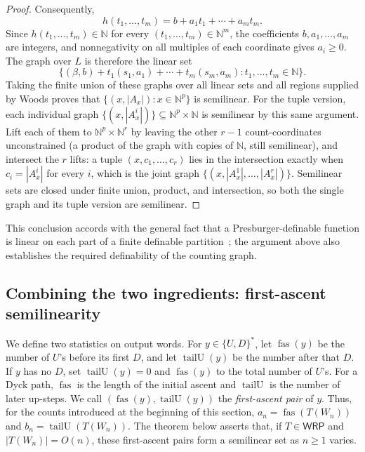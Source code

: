 \documentclass[11pt]{article}
\theoremstyle{definition}
\newcommand{\N}{\mathbb N}
\newcommand{\WRP}{\mathsf{WRP}}
\newcommand{\fas}{\operatorname{fas}}
\newcommand{\tailU}{\operatorname{tailU}}
\begin{document}
\begin{proof}
Consequently,
\[
   h(t_1,\ldots,t_m)=b+a_1t_1+\cdots+a_mt_m.
\]
Since $h(t_1,\ldots,t_m)\in\N$ for every $(t_1,\ldots,t_m)\in\N^m$, the coefficients
$b,a_1,\ldots,a_m$ are integers, and nonnegativity on all multiples of each
coordinate gives $a_i\ge0$.  The graph over $L$ is therefore the linear set
\[
   \{(\beta,b)+t_1(s_1,a_1)+\cdots+t_m(s_m,a_m):
       t_1,\ldots,t_m\in\N\}.
\]
Taking the finite union of these graphs over all linear sets and all regions
supplied by Woods proves that $\{(x,|A_x|):x\in\N^p\}$ is semilinear.  For the
tuple version, each individual graph
$\{(x,|A^i_x|)\}\subseteq\N^p\times\N$ is semilinear by this same argument.
Lift each of them to $\N^p\times\N^r$ by leaving the other $r-1$
count-coordinates unconstrained (a product of the graph with copies of $\N$,
still semilinear), and intersect the $r$ lifts: a tuple $(x,c_1,\ldots,c_r)$
lies in the intersection exactly when $c_i=|A^i_x|$ for every $i$, which is the
joint graph $\{(x,|A^1_x|,\ldots,|A^r_x|)\}$.  Semilinear sets are closed under
finite union, product, and intersection, so both the single graph and its tuple
version are semilinear.
\end{proof}

This conclusion accords with the general fact that a Presburger-definable
function is linear on each part of a finite definable
partition~\cite[Corollary~3.1.4]{CluckersHalupczok2018}; the argument above
also establishes the required definability of the counting graph.

\subsection{Combining the two ingredients: first-ascent semilinearity}

We define two statistics on output words.  For $y\in\{U,D\}^*$, let $\fas(y)$
be the number of $U$'s before its first $D$, and let $\tailU(y)$ be the number
after that $D$.
If $y$ has no $D$, set $\tailU(y)=0$ and $\fas(y)$ to the total number of
$U$'s.  For a Dyck path, $\fas$ is the length of the initial ascent and
$\tailU$ is the number of later up-steps.  We call
$(\fas(y),\tailU(y))$ the \emph{first-ascent pair} of $y$.  Thus, for the
counts introduced at the beginning of this section,
$a_n=\fas(T(W_n))$ and $b_n=\tailU(T(W_n))$.
The theorem below asserts that, if $T\in\WRP$ and $|T(W_n)|=O(n)$, these
first-ascent pairs form a semilinear set as $n\ge1$ varies.
\end{document}
